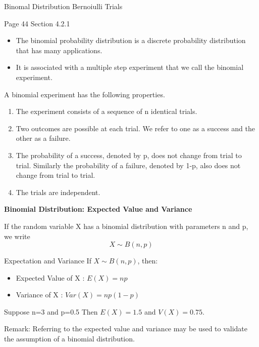 
	Binomal Distribution
	Bernoiulli Trials
	
	Page 44
	Section 4.2.1 
	
	\begin{itemize}
		\item The binomial probability distribution is a discrete probability distribution that has many applications.
		\item It is associated with a multiple step experiment that we call the binomial experiment.
	\end{itemize}
	
	A binomial experiment has the following properties.
	
	\begin{enumerate}
		\item The experiment consists of a sequence of n identical trials.
		
		\item Two outcomes are possible at each trial. We refer to one as a success and the other as a failure.
		
		\item The probability of a success, denoted by p, does not change from trial to trial. Similarly the probability of a failure, denoted by 1-p, also does not change from trial to trial.
		
		\item The trials are independent.
	\end{enumerate}
	

	\textbf{Binomial Distribution: Expected Value and Variance}
	
	
	If the random variable X has a binomial distribution with parameters n
	and p, we write
	\[ X \sim B(n,p) \]
	
	Expectation and Variance
	If $X \sim B(n,p)$, then:
	
	\begin{itemize}
		\item Expected Value of X : $E(X) = np$
		\item Variance of X : $Var(X) = np(1-p)$
	\end{itemize}
	
	Suppose n=3 and p=0.5 
	Then $E(X) = 1.5$ and $V(X) = 0.75$.
	
	Remark: Referring to the expected value and variance may be used to validate
	the assumption of a binomial distribution.


	
	
